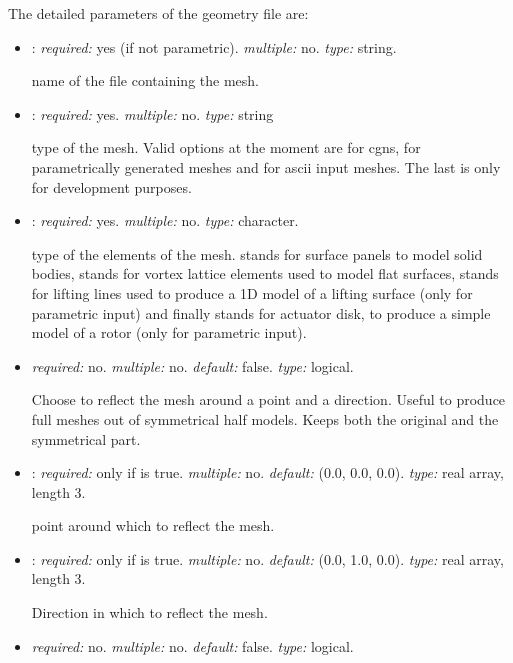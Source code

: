The detailed parameters of the geometry file are:
\begin{itemize}
\item {}: \textit{required:} yes (if not parametric). \textit{multiple:} no. \textit{type:} string. 

name of the file containing the mesh.

\item {}: \textit{required:} yes. \textit{multiple:} no. \textit{type:} string

type of the mesh. Valid options at the moment are  for cgns,  
for parametrically generated meshes and  for ascii input meshes. 
The last is only for development purposes. 

\item {}: \textit{required:} yes. \textit{multiple:} no. \textit{type:} character.

type of the elements of the mesh.  stands for surface panels to model solid bodies, 
 stands for vortex lattice elements used to model flat surfaces,  stands for 
lifting lines used to produce a 1D model of a lifting surface (only for parametric input) and 
finally  stands for actuator disk, to produce a simple model of a rotor (only for parametric input). 

\item {} \textit{required:} no. \textit{multiple:} no. \textit{default:} false. \textit{type:} logical.

Choose to reflect the mesh around a point and a direction. Useful to produce full meshes out 
of symmetrical half models. Keeps both the original and the symmetrical part. 

\item {}: \textit{required:} only if  is true. 
\textit{multiple:} no. \textit{default:} (0.0, 0.0, 0.0). \textit{type:} real array, length 3.

point around which to reflect the mesh.

\item {}: \textit{required:} only if  is true. 
\textit{multiple:} no. \textit{default:} (0.0, 1.0, 0.0). \textit{type:} real array, length 3.

Direction in which to reflect the mesh.

\item {} \textit{required:} no. \textit{multiple:} no. \textit{default:} false. \textit{type:} logical.


\end{itemize}
